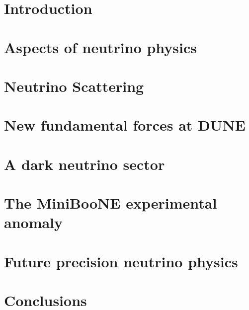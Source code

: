 \documentclass[openany,twoside,frontopenright]{ip3thesis}
\begin{document}
\chapter{Introduction}



\chapter{Aspects of neutrino physics}


\chapter{Neutrino Scattering}


\chapter{New fundamental forces at DUNE}


\chapter{A dark neutrino sector}
%

\chapter{The MiniBooNE experimental anomaly}
%

\chapter{Future precision neutrino physics}
%

\chapter{Conclusions}

\end{document}
